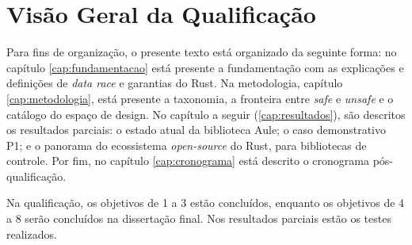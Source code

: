 \section{Visão Geral da Qualificação}

Para fins de organização, o presente texto está organizado da seguinte forma: no capítulo \ref{cap:fundamentacao} está presente a fundamentação com as explicações e definições de \textit{data race} e garantias do Rust. Na metodologia, capítulo \ref{cap:metodologia}, está presente a taxonomia, a fronteira entre \textit{safe} e \textit{unsafe} e o catálogo do espaço de design. No capítulo a seguir (\ref{cap:resultados}), são descritos os resultados parciais: o estado atual da biblioteca Aule; o caso demonstrativo P1; e o panorama do ecossistema \textit{open-source} do Rust, para bibliotecas de controle. Por fim, no capítulo \ref{cap:cronograma} está descrito o cronograma pós-qualificação.

Na qualificação, os objetivos de 1 a 3 estão concluídos, enquanto os objetivos de 4 a 8 serão concluídos na dissertação final. Nos resultados parciais estão os testes realizados.
